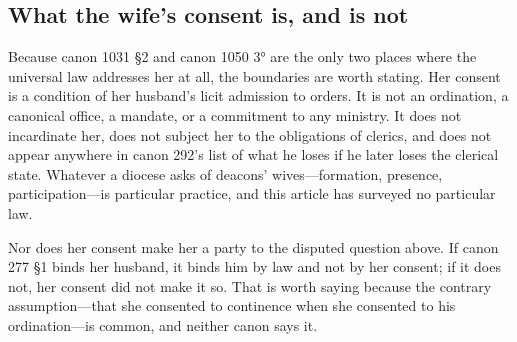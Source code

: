\subsection{What the wife's consent is, and is not}

Because canon 1031 §2 and canon 1050 3° are the only two places where the universal law addresses her at all, the boundaries are worth stating. Her consent is a condition of her husband's licit admission to orders. It is not an ordination, a canonical office, a mandate, or a commitment to any ministry. It does not incardinate her, does not subject her to the obligations of clerics, and does not appear anywhere in canon 292's list of what he loses if he later loses the clerical state. Whatever a diocese asks of deacons' wives---formation, presence, participation---is particular practice, and this article has surveyed no particular law.

Nor does her consent make her a party to the disputed question above. If canon 277 §1 binds her husband, it binds him by law and not by her consent; if it does not, her consent did not make it so. That is worth saying because the contrary assumption---that she consented to continence when she consented to his ordination---is common, and neither canon says it.
